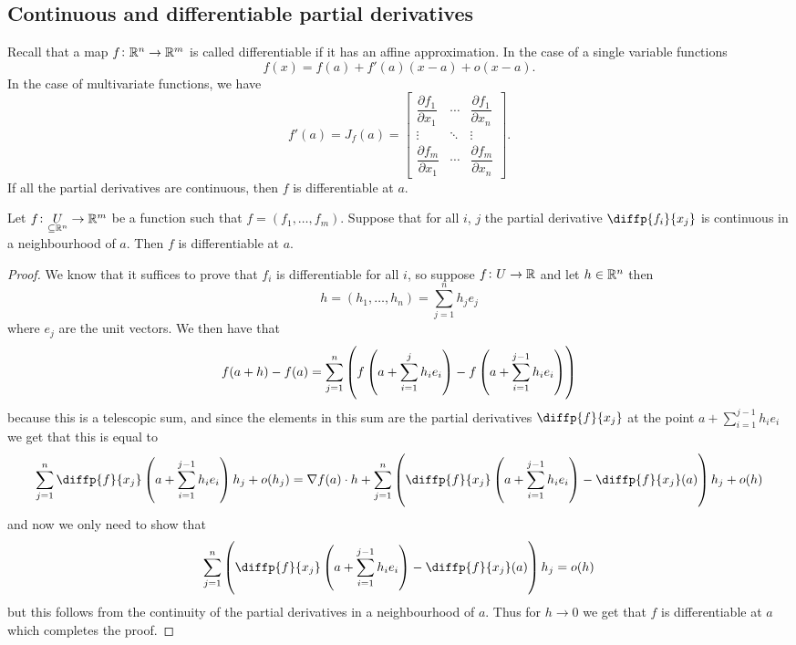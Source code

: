 \documentclass[11pt,a4paper]{article}
\begin{document}
\subsection{Continuous and differentiable partial derivatives}
Recall that a map $f \colon \mathbb{R}^n \to \mathbb{R}^m$ is called differentiable if
it has an affine approximation.
In the case of a single variable functions
\[
  f(x) = f(a) + f'(a)(x - a) + o(x - a).
\]
In the case of multivariate functions, we have
\[
  f'(a) = J_f(a) = {\begin{bmatrix}
    {\dfrac {\partial f_{1}}{\partial x_{1}}}&\cdots &{\dfrac {\partial 
    f_{1}}{\partial x_{n}}}\\\vdots &\ddots &\vdots \\{\dfrac {\partial 
    f_{m}}{\partial x_{1}}}&\cdots &{\dfrac {\partial f_{m}}{\partial 
    x_{n}}}\end{bmatrix}}.
\]
If all the partial derivatives are continuous, then $f$ is differentiable at
$a$.

\begin{proposition}
  Let $f \colon \underset{\subseteq \mathbb{R}^n}{U} \to \mathbb{R}^m$ be a function
  such that $f = (f_1,\dots,f_m)$.
  Suppose that for all $i$, $j$ the partial derivative $\diffp{{f_i}}{{x_j}}$
  is continuous in a neighbourhood of $a$.
  Then $f$ is differentiable at $a$.
\end{proposition}
\begin{proof}
  We know that it suffices to prove that $f_i$ is differentiable for
  all $i$, so suppose $f \colon U \to \mathbb{R}$ and let $h \in \mathbb{R}^n$ then
  \[
    h = (h_1,\dots,h_n) = \sum_{j=1}^{n} h_j e_j
  \]
  where $e_j$ are the unit vectors.
  We then have that
  \[
    f(a + h) - f(a) =
    \sum_{j=1}^{n}
    \del
    {
      f\del{a + \sum_{i=1}^{j} h_i e_i} -
      f\del{a + \sum_{i=1}^{j - 1} h_i e_i}
    }
  \]
  because this is a telescopic sum, and since the elements in this sum
  are the partial derivatives $\diffp{f}{{x_j}}$ at the point
  $a + \sum_{i=1}^{j - 1} h_i e_i$ we get that this is equal to
  \[
    \sum_{j=1}^{n} \diffp{f}{{x_j}} \del{a + \sum_{i=1}^{j - 1} h_i e_i} h_j
    + o(h_j) =
    \nabla f(a) \cdot h +
    \sum_{j=1}^{n} \del{\diffp{f}{{x_j}} 
    \del{a + \sum_{i=1}^{j - 1} h_i e_i} - \diffp{f}{{x_j}}(a)} h_j
    + o(h)
  \]
  and now we only need to show that
  \[
    \sum_{j=1}^{n} \del{\diffp{f}{{x_j}} 
    \del{a + \sum_{i=1}^{j - 1} h_i e_i} - \diffp{f}{{x_j}}(a)} h_j
    = o(h)
  \]
  but this follows from the continuity of the partial derivatives in a
  neighbourhood of $a$.
  Thus for $h \to 0$ we get that $f$ is differentiable at $a$ which completes
  the proof.
\end{proof}
\end{document}
